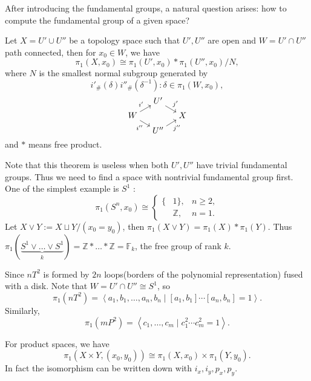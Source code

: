 After introducing the fundamental groups, a natural question arises:
how to compute the fundamental group of a given space?
\begin{theorem}
    Let $X = U'\cup U''$ be a topology space such that
	$U', U''$ are open and $W = U'\cap U''$ path connected, then for $x_0\in W$,
	we have
	\[
		\pi_1(X, x_0) \cong \pi_1(U', x_0) * \pi_1(U'', x_0) / N,
	\]
	where $N$ is the smallest normal subgroup generated by
	\[
	i'_\#(\delta) i''_\#(\delta^{-1}): \delta\in \pi_1(W, x_0),
	\]
	\begin{equation*}
	\begin{tikzcd}[sep=small, row sep=tiny, cramped]
		&U'\drar["j'"]\\ W\urar["i'"]\drar["i''"'] &&X\\ &U''\urar["j''"']
	\end{tikzcd}
	\end{equation*}
	and $*$ means free product.
\end{theorem}

Note that this theorem is useless when both $U', U''$ have trivial fundamental groups.
Thus we need to find a space with nontrivial fundamental group first.
One of the simplest example is $S^1$ :
\[
\pi_1(S^n, x_0) \cong \left\{\begin{aligned}
		\{&1\}, & n\ge 2,\\ &\mathbb{Z}, & n = 1.
\end{aligned}\right.
\]
Let $X\vee Y := X\sqcup Y / (x_0=y_0)$, then $\pi_1(X\vee Y) = \pi_1(X)*\pi_1(Y)$.
Thus $\pi_1(\underbrace{S^1\vee \dots\vee S^1}_{k}) = \mathbb{Z}*\dots*\mathbb{Z}
= \mathbb{F}_k$, the free group of rank $k$.

\begin{example}
    Since $nT^2$ is formed by $2n$ loops(borders of the polynomial representation)
	fused with a disk. Note that $W = U'\cap U'' \cong S^1$, so
	\[
	\pi_1(nT^2) = \left<a_1,b_1,\dots,a_n,b_n \mid [a_1,b_1]\cdots[a_n,b_n]=1\right>.
	\]
	Similarly,
	\[
	\pi_1(mP^2) = \left<c_1,\dots,c_m \mid c_1^2\cdots c_m^2 = 1 \right>.
	\]
\end{example}
\begin{example}
	For product spaces, we have
    \[
    \pi_1(X\times Y, (x_0, y_0)) \cong \pi_1(X, x_0) \times \pi_1(Y, y_0).
    \]
	In fact the isomorphism can be written down with $i_x, i_y, p_x, p_y$.
\end{example}
